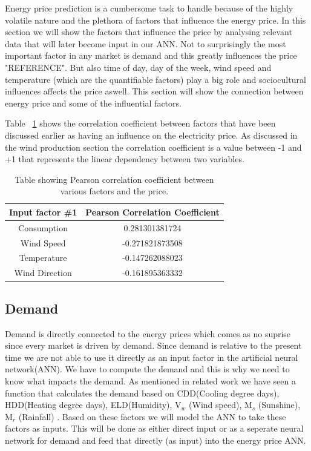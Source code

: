 Energy price prediction is a cumbersome task to handle because of the highly volatile nature and the plethora of factors that influence the energy price. In this section we will show the factors that influence the price by analysing relevant data that will later become input in our ANN. Not to surprisingly the most important factor in any market is demand and this greatly influences the price "REFERENCE". But also time of day, day of the week, wind speed and temperature (which are the quantifiable factors) play a big role and sociocultural influences affects the price aswell. This section will show the connection between energy price and some of the influential factors.

Table ~\ref{table:pearsonCoeficientPrice} shows the correlation coefficient between factors that have been discussed earlier as having an influence on the electricity price. As discussed in the wind production section the correlation coefficient is a value between -1 and +1 that represents the linear dependency between two variables. 

\begin{table}[H]
\centering  %
\begin{tabular}{c c} %
Input factor \#1 & Pearson Correlation Coefficient \\ [0.5ex] %
\hline                  %
Consumption & 0.281301381724 \\ %
Wind Speed & -0.271821873508 \\
Temperature & -0.147262088023 \\
Wind Direction & -0.161895363332 \\ [1ex] %
\hline %
\end{tabular}
\caption{Table showing Pearson correlation coefficient between various factors and the price.} %
\label{table:pearsonCoeficientPrice} %
\end{table}

\subsection{Demand}
Demand is directly connected to the energy prices which comes as no suprise since every market is driven by demand. Since demand is relative to the present time we are not able to use it directly as an input factor in the artificial neural network(ANN). We have to compute the demand and this is why we need to know what impacts the demand. As mentioned in related work we have seen a function that calculates the demand based on CDD(Cooling degree days), HDD(Heating degree days), ELD(Humidity), V$_w$ (Wind speed), M$_s$ (Sunshine), M$_r$ (Rainfall) \cite{19}. Based on these factors we will model the ANN to take these factors as inputs. This will be done as either direct input or as a seperate neural network for demand and feed that directly (as input) into the energy price ANN.

